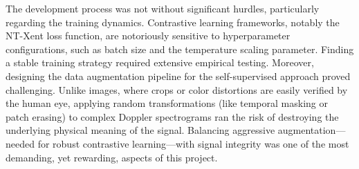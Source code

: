 The development process was not without significant hurdles, particularly regarding the training dynamics. Contrastive learning frameworks, notably the NT-Xent loss function, are notoriously sensitive to hyperparameter configurations, such as batch size and the temperature scaling parameter. Finding a stable training strategy required extensive empirical testing. Moreover, designing the data augmentation pipeline for the self-supervised approach proved challenging. Unlike images, where crops or color distortions are easily verified by the human eye, applying random transformations (like temporal masking or patch erasing) to complex Doppler spectrograms ran the risk of destroying the underlying physical meaning of the signal. Balancing aggressive augmentation—needed for robust contrastive learning—with signal integrity was one of the most demanding, yet rewarding, aspects of this project.